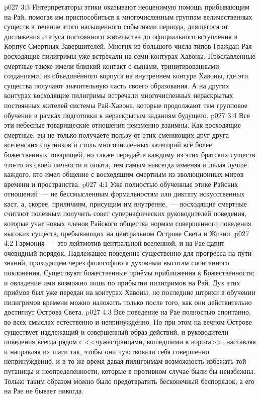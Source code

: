 \vs p027 3:3 Интерпретаторы этики оказывают неоценимую помощь прибывающим на Рай, помогая им приспособиться к многочисленным группам величественных существ в течение этого насыщенного событиями периода, длящегося от достижения статуса постоянного жительства до официального вступления в Корпус Смертных Завершителей. Многих из большого числа типов Граждан Рая восходящие пилигримы уже встречали на семи контурах Хавоны. Прославленные смертные также имели близкий контакт с сынами, тринитизованными созданиями, из объединённого корпуса на внутреннем контуре Хавоны, где эти существа получают значительную часть своего образования. А на других контурах восходящие пилигримы встречали многочисленных нераскрытых постоянных жителей системы Рай\hyp{}Хавона, которые продолжают там групповое обучение в рамках подготовки к нераскрытым заданиям будущего.
\vs p027 3:4 Все эти небесные товарищеские отношения неизменно взаимны. Как восходящие смертные, вы не только получаете пользу от этих сменяющих друг друга вселенских спутников и столь многочисленных категорий всё более божественных товарищей, но также передаёте каждому из этих братских существ что\hyp{}то из своей личности и опыта, тем самым навсегда изменяя и делая лучше каждого, кто имел общение с восходящим смертным из эволюционных миров времени и пространства.
\vs p027 4:1 Уже полностью обученные этике Райских отношений~--- не бессмысленным формальностям или диктату искусственных каст, а, скорее, приличиям, присущим им внутренне,~--- восходящие смертные считают полезным получить совет супернафических руководителей поведения, которые учат новых членов Райского общества нормам совершенного поведения высоких существ, пребывающих на центральном Острове Света и Жизни.
\vs p027 4:2 Гармония~--- это лейтмотив центральной вселенной, и на Рае царит очевидный порядок. Надлежащее поведение существенно для прогресса на пути знаний, проходящем через философию к духовным высотам спонтанного поклонения. Существуют божественные приёмы приближения к Божественности; и овладение ими возможно лишь по прибытии пилигримов на Рай. Дух этих приёмов был уже передан на контурах Хавоны, но последние штрихи в обучении пилигримов времени можно наложить только после того, как они действительно достигнут Острова Света.
\vs p027 4:3 Всё поведение на Рае полностью спонтанно, во всех смыслах естественно и непринуждённо. Но при этом на вечном Острове существует надлежащий и совершенный образ действий, и руководители поведения всегда рядом с <<чужестранцами, вошедшими в ворота>>, наставляя и направляя их шаги так, чтобы они чувствовали себя совершенно непринуждённо, и в то же время давая пилигримам возможность избежать той путаницы и неопределённости, которые в противном случае были бы неизбежны. Только таким образом можно было предотвратить бесконечный беспорядок; а его на Рае не бывает никогда.
